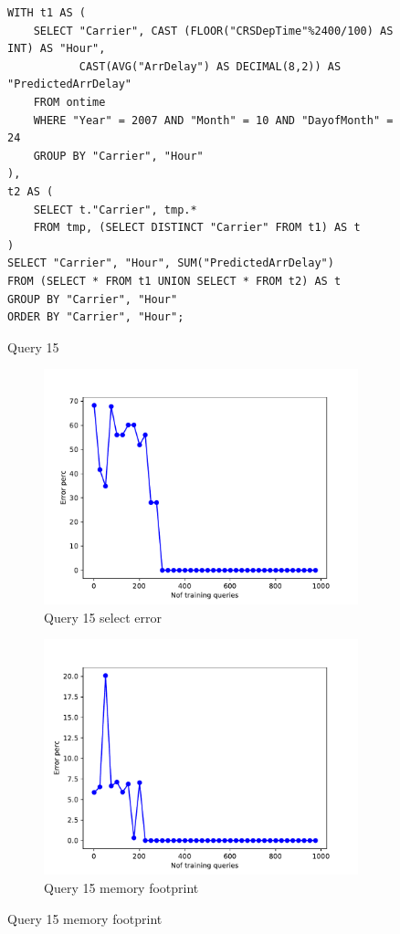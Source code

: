 \begin{figure}[t]
\begin{lstlisting}[frame=single]
WITH t1 AS (
    SELECT "Carrier", CAST (FLOOR("CRSDepTime"%2400/100) AS INT) AS "Hour",
           CAST(AVG("ArrDelay") AS DECIMAL(8,2)) AS "PredictedArrDelay"
    FROM ontime
    WHERE "Year" = 2007 AND "Month" = 10 AND "DayofMonth" = 24
    GROUP BY "Carrier", "Hour"
),
t2 AS (
    SELECT t."Carrier", tmp.*
    FROM tmp, (SELECT DISTINCT "Carrier" FROM t1) AS t
)
SELECT "Carrier", "Hour", SUM("PredictedArrDelay")
FROM (SELECT * FROM t1 UNION SELECT * FROM t2) AS t
GROUP BY "Carrier", "Hour"
ORDER BY "Carrier", "Hour";
\end{lstlisting}
  \caption{Query 15}
  \label{sel:sql15}
\end{figure}


\begin{figure}[t!]
  \begin{subfigure}[t]{0.5\textwidth}
    \includegraphics[scale=0.4]{figs/airtraffic/airtraffic_sel15_1_error.pdf}
    \caption{Query 15 select error}
    \label{fig:sel19}
  \end{subfigure}
  \begin{subfigure}[t]{0.5\textwidth}
    \includegraphics[scale=0.4]{figs/airtraffic/airtraffic_q15_1_memerror.pdf}
    \caption{Query 15 memory footprint}
    \label{fig:sel19}
   \end{subfigure}


\end{figure}
